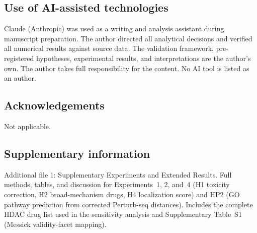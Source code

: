 \documentclass[11pt]{article}
\begin{document}
\subsection*{Use of AI-assisted technologies}
Claude (Anthropic) was used as a writing and analysis assistant during
manuscript preparation. The author directed all analytical decisions and
verified all numerical results against source data. The validation framework,
pre-registered hypotheses, experimental results, and interpretations are
the author's own. The author takes full responsibility for the content.
No AI tool is listed as an author.

\subsection*{Acknowledgements}
Not applicable.

\subsection*{Supplementary information}
Additional file 1: Supplementary Experiments and Extended Results.
Full methods, tables, and discussion for Experiments~1, 2, and~4
(H1 toxicity correction, H2 broad-mechanism drugs, H4 localization
score) and HP2 (GO pathway prediction from corrected Perturb-seq
distances). Includes the complete HDAC drug list used in the
sensitivity analysis and Supplementary Table~S1 (Messick validity-facet
mapping).



\end{document}
